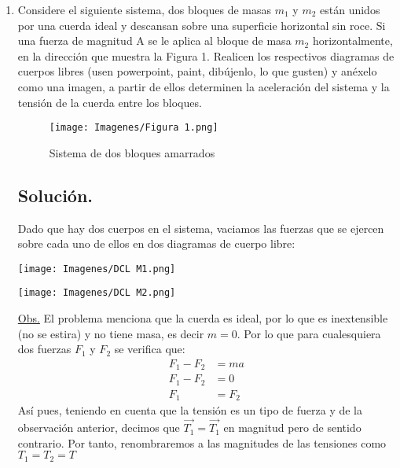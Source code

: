 \documentclass[letterpaper,12pt]{article}
\newenvironment{Figura}
{\par\medskip\noindent\minipage{\linewidth}}
  {\endminipage\par\medskip}
\begin{document}
\begin{enumerate}


    

    \item Considere el siguiente sistema, dos bloques de masas $m_1$ y $m_2$ están unidos por una cuerda ideal y descansan sobre una superficie horizontal sin roce. Si una fuerza de magnitud A se le aplica al bloque de masa $m_2$ horizontalmente, en la dirección que muestra la Figura 1. Realicen los respectivos diagramas de cuerpos libres (usen powerpoint, paint, dibújenlo, lo que gusten) y anéxelo como una imagen, a partir de ellos determinen la aceleración del sistema y la tensión de la cuerda entre los bloques.
    \begin{figure}
        \centering
        \texttt{[image: Imagenes/Figura 1.png]}
        \caption{Sistema de dos bloques amarrados}
        \label{fig:my_label}
    \end{figure}
\subsection*{Solución.}
Dado que hay dos cuerpos en el sistema, vaciamos las fuerzas que se ejercen sobre cada uno de ellos en dos diagramas de cuerpo libre:
\begin{multicols}{2}
    \begin{Figura}
        \centering
        \texttt{[image: Imagenes/DCL M1.png]}
        \label{fig:my_label}
    \end{Figura}
    \columnbreak
    \begin{Figura}
        \centering
        \texttt{[image: Imagenes/DCL M2.png]}
        \label{fig:my_label}
    \end{Figura}
\end{multicols}

\underline{Obs.} El problema menciona que la cuerda es ideal, por lo que es inextensible (no se estira) y no tiene masa, es decir $m=0$. Por lo que para cualesquiera dos fuerzas $F_1$ y $F_2$ se verifica que:
    \begin{align*}
        F_1 - F_2 &= ma\\
        F_1 - F_2 &= 0\\
        F_1  &= F_2
    \end{align*}
Así pues, teniendo en cuenta que la tensión es un tipo de fuerza y de la observación anterior, decimos que $\vec{T_1} = \vec{T_1}$ en magnitud pero de sentido contrario. Por tanto, renombraremos a las magnitudes de las tensiones como $T_1= T_2 =T$


\end{enumerate}
\end{document}
